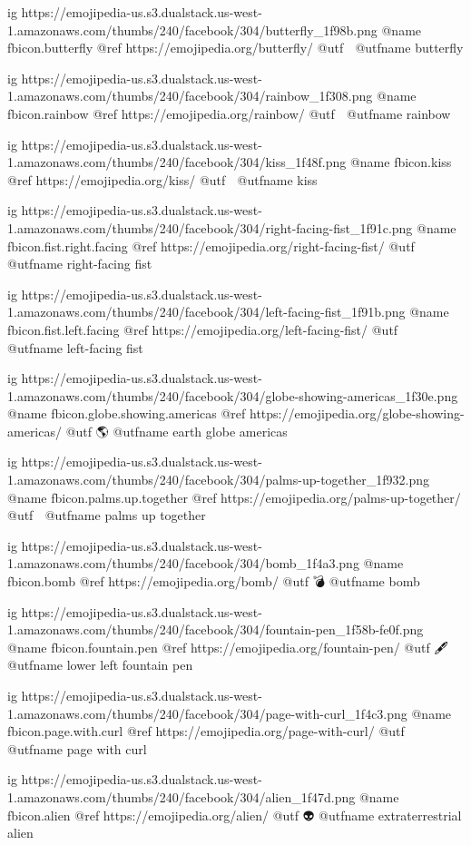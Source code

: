   ig https://emojipedia-us.s3.dualstack.us-west-1.amazonaws.com/thumbs/240/facebook/304/butterfly_1f98b.png
  @name fbicon.butterfly
  @ref https://emojipedia.org/butterfly/
  @utf 🦋
  @utfname butterfly

  ig https://emojipedia-us.s3.dualstack.us-west-1.amazonaws.com/thumbs/240/facebook/304/rainbow_1f308.png
  @name fbicon.rainbow
  @ref https://emojipedia.org/rainbow/
  @utf 🌈
  @utfname rainbow

  ig https://emojipedia-us.s3.dualstack.us-west-1.amazonaws.com/thumbs/240/facebook/304/kiss_1f48f.png
  @name fbicon.kiss
  @ref https://emojipedia.org/kiss/
  @utf 💏
  @utfname kiss

  ig https://emojipedia-us.s3.dualstack.us-west-1.amazonaws.com/thumbs/240/facebook/304/right-facing-fist_1f91c.png
  @name fbicon.fist.right.facing
  @ref https://emojipedia.org/right-facing-fist/
  @utf 🤜
  @utfname right-facing fist

  ig https://emojipedia-us.s3.dualstack.us-west-1.amazonaws.com/thumbs/240/facebook/304/left-facing-fist_1f91b.png
  @name fbicon.fist.left.facing
  @ref https://emojipedia.org/left-facing-fist/
  @utf 🤛
  @utfname left-facing fist

  ig https://emojipedia-us.s3.dualstack.us-west-1.amazonaws.com/thumbs/240/facebook/304/globe-showing-americas_1f30e.png
  @name fbicon.globe.showing.americas
  @ref https://emojipedia.org/globe-showing-americas/
  @utf 🌎
  @utfname earth globe americas

  ig https://emojipedia-us.s3.dualstack.us-west-1.amazonaws.com/thumbs/240/facebook/304/palms-up-together_1f932.png
  @name fbicon.palms.up.together
  @ref https://emojipedia.org/palms-up-together/
  @utf 🤲
  @utfname palms up together

  ig https://emojipedia-us.s3.dualstack.us-west-1.amazonaws.com/thumbs/240/facebook/304/bomb_1f4a3.png
  @name fbicon.bomb
  @ref https://emojipedia.org/bomb/
  @utf 💣
  @utfname bomb

  ig https://emojipedia-us.s3.dualstack.us-west-1.amazonaws.com/thumbs/240/facebook/304/fountain-pen_1f58b-fe0f.png
  @name fbicon.fountain.pen
  @ref https://emojipedia.org/fountain-pen/
  @utf 🖋
  @utfname lower left fountain pen

  ig https://emojipedia-us.s3.dualstack.us-west-1.amazonaws.com/thumbs/240/facebook/304/page-with-curl_1f4c3.png
  @name fbicon.page.with.curl
  @ref https://emojipedia.org/page-with-curl/
  @utf 📃
  @utfname page with curl

  ig https://emojipedia-us.s3.dualstack.us-west-1.amazonaws.com/thumbs/240/facebook/304/alien_1f47d.png
  @name fbicon.alien
  @ref https://emojipedia.org/alien/
  @utf 👽
  @utfname extraterrestrial alien

